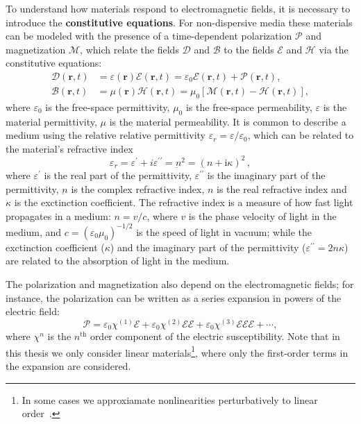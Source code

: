 To understand how materials respond to electromagnetic fields, it is necessary to introduce the \textbf{constitutive equations}.
 For non-dispersive media these materials can be
modeled
with the presence of a time-dependent polarization $\bm{\mathcal{P}}$ and
magnetization $\bm{\mathcal{M}}$,
which relate the fields $\bm{\mathcal{D}}$ and $\bm{\mathcal{B}}$ to the fields
$\bm{\mathcal{E}}$ and
$\bm{\mathcal{H}}$ via the constitutive equations:
\begin{align}
    \bm{\mathcal{D}}(\mathbf{r}, t) & = \varepsilon(\mathbf{r}) \bm{\mathcal{E}}(\mathbf{r}, t) =
    \varepsilon_0 \bm{\mathcal{E}}(\mathbf{r}, t) + \bm{\mathcal{P}}(\mathbf{r}, t),
    \label{eq:D}                                                                \\
    \bm{\mathcal{B}}(\mathbf{r}, t) & =  \mu(\mathbf{r}) \bm{\mathcal{H}}(\mathbf{r},
    t) = \mu_0 \left[ \bm{\mathcal{M}}(\mathbf{r},
    t) - \bm{\mathcal{H}}(\mathbf{r}, t)\right] \label{eq:H},
\end{align}
where $\varepsilon_0$ is the free-space permittivity, $\mu_0$ is the free-space
permeability, $\varepsilon$ is the material permittivity, 
$\mu$ is the material permeability. It is common to describe a medium
using the relative relative permittivity $\varepsilon_r=\varepsilon/\varepsilon_0$, which can be related to the material's refractive index~\cite{wooten}
\begin{equation}\label{eq:perm}
    \varepsilon_r = \varepsilon^\prime +
i\varepsilon^{\prime\prime} = \underbar{n}^2 = (n+\text{i}\kappa)^2\,,
\end{equation}
where $\varepsilon^\prime$ is the real part of the permittivity, $\varepsilon^{\prime\prime}$ is the imaginary part of the permittivity, $\underbar{n}$ is the complex refractive index, 
$n$ is the real refractive index and $\kappa$ is the exctinction coefficient. 
The refractive index is a measure of how fast light propagates in a medium: $n=v/c$, where $v$ is the phase velocity of light in the medium, and 
$c=(\varepsilon_0 \mu_0)^{-1/2}$ is the speed of light in vacuum; while the exctinction
coefficient ($\kappa$) and the imaginary part of the permittivity ($\varepsilon^{\prime\prime}=2n\kappa$) are related to the absorption of light in the medium.

The polarization and magnetization also depend on the electromagnetic
fields; for instance, the
polarization can be written as a series expansion in powers of the electric
field:
\begin{equation}\label{eq:polarization}
\bm{\mathcal{P}}=\mathcal{\varepsilon}_0 \bm{\mathcal{\chi}}^{(1)}
    \bm{\mathcal{E}}+\mathcal{\varepsilon}_0 \bm{\mathcal{\chi}}^{(2)}
    \bm{\mathcal{E}} \bm{\mathcal{E}}+\mathcal{\varepsilon}_0
    \bm{\mathcal{\chi}}^{(3)} \bm{\mathcal{E}} \bm{\mathcal{E}}
    \bm{\mathcal{E}}+\cdots,
\end{equation}
where $\bm{\mathcal{\chi}}^{n}$ is the $n^\text{th}$ order component of the
electric susceptibility. Note that in this thesis
we only consider linear materials\footnote{In some cases we approxiamate nonlinearities perturbatively to linear
order~\cite{ownpub4}.}, where only the first-order terms in the expansion are
considered. \\

